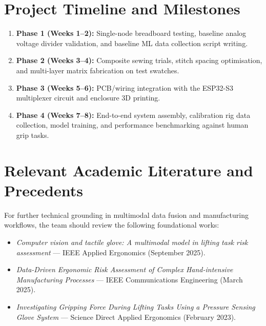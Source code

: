 \documentclass[11pt,a4paper]{article}
\begin{document}
\section{Project Timeline and Milestones}
\begin{enumerate}
    \item \textbf{Phase 1 (Weeks 1--2):} Single-node breadboard testing, baseline analog voltage divider validation, and baseline ML data collection script writing.
    \item \textbf{Phase 2 (Weeks 3--4):} Composite sewing trials, stitch spacing optimisation, and multi-layer matrix fabrication on test swatches.
    \item \textbf{Phase 3 (Weeks 5--6):} PCB/wiring integration with the ESP32-S3 multiplexer circuit and enclosure 3D printing.
    \item \textbf{Phase 4 (Weeks 7--8):} End-to-end system assembly, calibration rig data collection, model training, and performance benchmarking against human grip tasks.
\end{enumerate}

\section{Relevant Academic Literature and Precedents}
For further technical grounding in multimodal data fusion and manufacturing workflows, the team should review the following foundational works:
\begin{itemize}
    \item \textit{Computer vision and tactile glove: A multimodal model in lifting task risk assessment} --- IEEE Applied Ergonomics (September 2025).
    \item \textit{Data-Driven Ergonomic Risk Assessment of Complex Hand-intensive Manufacturing Processes} --- IEEE Communications Engineering (March 2025).
    \item \textit{Investigating Gripping Force During Lifting Tasks Using a Pressure Sensing Glove System} --- Science Direct Applied Ergonomics (February 2023).
\end{itemize}
\end{document}
